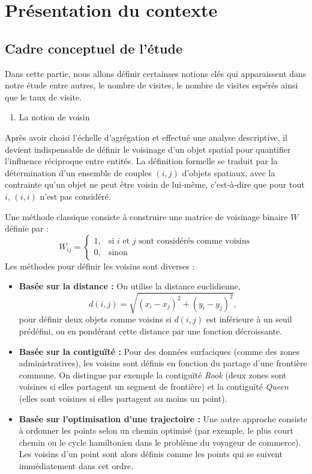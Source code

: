 \documentclass[
]{article}
\author{}
\date{\vspace{-2.5em}}
\providecommand{\tightlist}{%
  \setlength{\itemsep}{0pt}\setlength{\parskip}{0pt}}
\begin{document}
\section{Présentation du contexte}\label{pruxe9sentation-du-contexte}

\subsection{Cadre conceptuel de
l'étude}\label{cadre-conceptuel-de-luxe9tude}

Dans cette partie, nous allons définir certainses notions clés qui
apparaissent dans notre étude entre autres, le nombre de visites, le
nombre de visites espérés ainsi que le taux de visite.

\begin{enumerate}
\def\labelenumi{\arabic{enumi}.}
\tightlist
\item
  La notion de voisin
\end{enumerate}

Après avoir choisi l'échelle d'agrégation et effectué une analyse
descriptive, il devient indispensable de définir le voisinage d'un objet
spatial pour quantifier l'influence réciproque entre entités. La
définition formelle se traduit par la détermination d'un ensemble de
couples \((i,j)\) d'objets spatiaux, avec la contrainte qu'un objet ne
peut être voisin de lui-même, c'est-à-dire que pour tout \(i\),
\((i,i)\) n'est pas considéré.

Une méthode classique consiste à construire une matrice de voisinage
binaire \(W\) définie par : \[
W_{ij} = \begin{cases} 
1, & \text{si } i \text{ et } j \text{ sont considérés comme voisins} \\
0, & \text{sinon}
\end{cases}
\] Les méthodes pour définir les voisins sont diverses :

\begin{itemize}
  \item \textbf{Basée sur la distance :}  
  On utilise la distance euclidienne,
  $$
  d(i,j) = \sqrt{(x_i - x_j)^2 + (y_i - y_j)^2},
  $$
  pour définir deux objets comme voisins si \(d(i,j)\) est inférieure à un seuil prédéfini, ou en pondérant cette distance par une fonction décroissante.
  
  \item \textbf{Basée sur la contiguïté :}  
  Pour des données surfaciques (comme des zones administratives), les voisins sont définis en fonction du partage d'une frontière commune. On distingue par exemple la contiguïté \emph{Rook} (deux zones sont voisines si elles partagent un segment de frontière) et la contiguïté \emph{Queen} (elles sont voisines si elles partagent au moins un point).
  
  \item \textbf{Basée sur l'optimisation d'une trajectoire :}  
  Une autre approche consiste à ordonner les points selon un chemin optimisé (par exemple, le plus court chemin ou le cycle hamiltonien dans le problème du voyageur de commerce). Les voisins d'un point sont alors définis comme les points qui se suivent immédiatement dans cet ordre.
\end{itemize}
\end{document}
